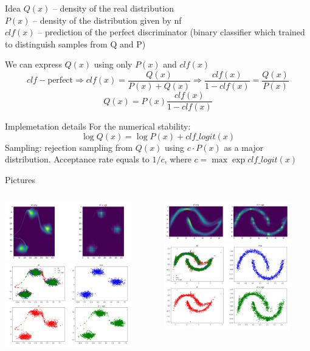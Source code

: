 \documentclass{beamer}
\begin{document}
\begin{frame}{Idea}
  $Q(x)$ -- density of the real distribution\\
  $P(x)$ -- density of the distribution given by nf\\
  $clf(x)$ -- prediction of the perfect discriminator (binary classifier which trained to distinguish samples from Q and P) \newline

  We can express $Q(x)$ using only $P(x)$ and $clf(x)$
  $$ clf - \text{perfect} \Rightarrow clf(x) = \frac{Q(x)}{P(x) + Q(x)} \Rightarrow \frac{clf(x)}{1 - clf(x)} = \frac{Q(x)}{P(x)} $$
  $$ Q(x) = P(x) \frac{clf(x)}{1 - clf(x)} $$

\end{frame}

\begin{frame}{Implemetation details}
  For the numerical stability:
  $$ \log Q(x) = \log P(x) + clf\_logit(x) $$
  Sampling: rejection sampling from $Q(x)$ using $c \cdot P(x)$ as a major distribution.
  Acceptance rate equals to $1/c$, where $c = \max \exp clf\_logit(x) $
\end{frame}

\begin{frame}{Pictures}
  \begin{columns}[T] %
    \begin{column}{.48\textwidth}
      \includegraphics[width=5.5cm]{imgs/blob_dens.png}
      \includegraphics[width=5.5cm]{imgs/blob_sample.png}
    \end{column}%
    \hfill%
    \begin{column}{.48\textwidth}
      \includegraphics[width=5.5cm]{imgs/moons_dens.png}
      \includegraphics[width=5.5cm]{imgs/moons_sample.png}
    \end{column}%
  \end{columns}
\end{frame}
\end{document}
